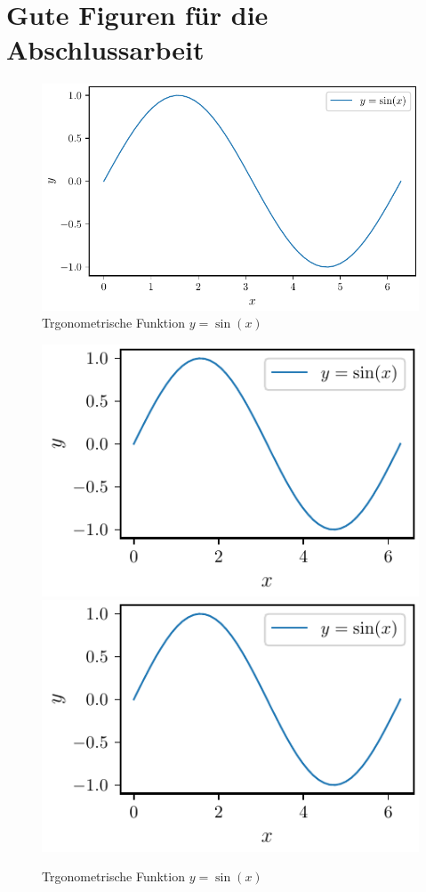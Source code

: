 \documentclass[a4paper, 12pt]{scrartcl}
\begin{document}
%
\section*{Gute Figuren für die Abschlussarbeit}

\begin{figure}[h]
  \centering
  \includegraphics{sinus.pdf}
  \caption{Trgonometrische Funktion $y=\sin(x)$}
\end{figure}
%
\begin{figure}[h]
  \centering
  \includegraphics{sinus_small.pdf}
  \includegraphics{sinus_small.pdf}
  \caption{Trgonometrische Funktion $y=\sin(x)$}
\end{figure}
\end{document}
